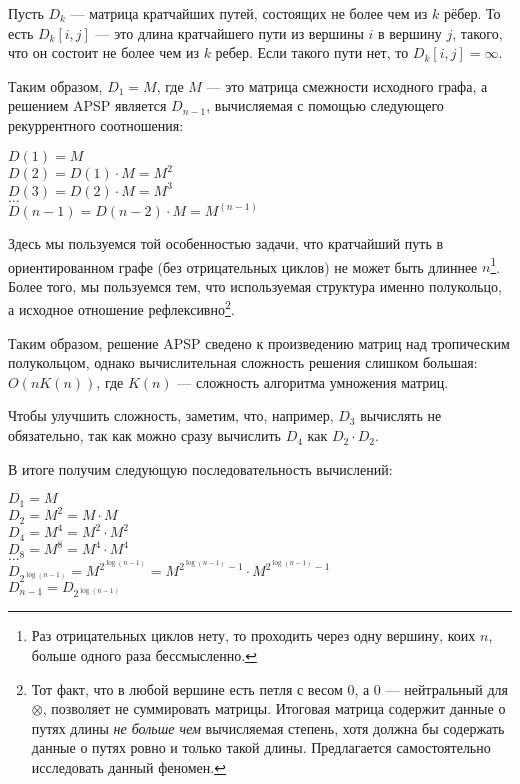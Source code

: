 Пусть $D_k$ --- матрица кратчайших путей, состоящих не более чем из $k$ рёбер. То есть $D_k[i,j]$ --- это длина кратчайшего пути из вершины $i$ в вершину $j$, такого, что он состоит не более чем из $k$ ребер. Если такого пути нет, то $D_k[i,j] = \infty$.

Таким образом, $D_1 = M$, где $M$ --- это матрица смежности исходного графа, а решением APSP является $D_{n-1}$, вычисляемая с помощью следующего рекуррентного соотношения: 

\begin{center}
    $D(1) = M$ \\
    $D(2) = D(1) \cdot M = M^2$ \\
    $D(3) = D(2) \cdot M = M^3$ \\
    $\dots$ \\
    $D(n-1) = D(n-2) \cdot M = M^{(n - 1)}$ \\
\end{center}

Здесь мы пользуемся той особенностью задачи, что кратчайший путь в ориентированном графе (без отрицательных циклов) не может быть длиннее $n$\footnote{Раз отрицательных циклов нету, то проходить через одну вершину, коих $n$, больше одного раза бессмысленно.}. 
Более того, мы пользуемся тем, что используемая структура именно полукольцо, а исходное отношение рефлексивно\footnote{Тот факт, что в любой вершине есть петля с весом 0, а 0 --- нейтральный для $\otimes$, позволяет не суммировать матрицы. Итоговая матрица содержит данные о путях длины \textit{не больше чем} вычисляемая степень, хотя должна бы содержать данные о путях ровно и только такой длины. Предлагается самостоятельно исследовать данный феномен.}. 

Таким образом, решение APSP сведено к произведению матриц над тропическим полукольцом, однако вычислительная сложность решения слишком большая: $O(n K(n))$, где $K(n)$ --- сложность алгоритма умножения матриц.

Чтобы улучшить сложность, заметим, что, например, $D_3$ вычислять не обязательно, так как можно сразу вычислить $D_4$ как $D_2 \cdot D_2$.

В итоге получим следующую последовательность вычислений:

\begin{center}
    $D_1 = M$ \\
    $D_2 = M^2 = M \cdot M$ \\
    $D_4 = M^4 = M^2 \cdot M^2$ \\
    $D_8 = M^8 = M^4 \cdot M^4$ \\
    $\dots$ \\
    $D_{2^{\log(n-1)}} = M^{2^{\log(n-1)}} = M^{2^{\log(n-1)} - 1} \cdot M^{2^{\log(n-1)} - 1}$ \\
    $D_{n-1} = D_{2^{\log(n-1)}}$ \\
\end{center}

